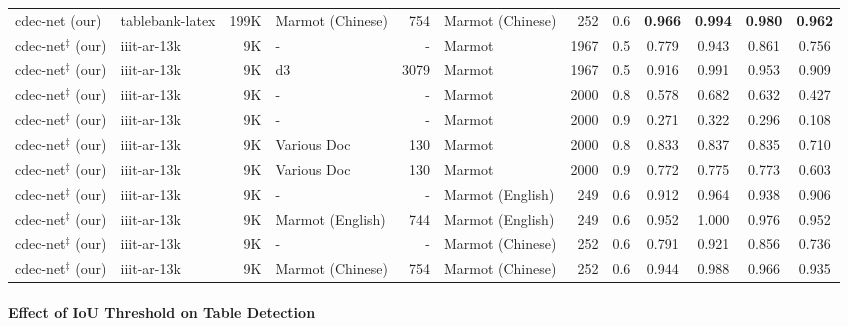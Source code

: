 \documentclass[a4paper,conference]{IEEEtran}
\begin{document}
\begin{table*}[ht!]
\begin{center}
\begin{tabular}{|l| l | r|l |r|l|r| c| c c c c|}
{\sc cd}e{\sc c-n}et (our) &{\sc t}able{\sc b}ank-{\sc l}a{\sc t}e{\sc x} &199K &Marmot (Chinese) &754 &Marmot (Chinese) &252 &0.6 &\textbf{0.966} &\textbf{0.994} &\textbf{0.980} &\textbf{0.962} \\ \hhline{|=|=|=|=|=|=|=|=|====|}
{\sc cd}e{\sc c-n}et$^{\ddagger}$ (our) &{\sc iiit-ar-13k} &9K &- &- &Marmot &1967 &0.5 &0.779 &0.943 &0.861 &0.756 \\
{\sc cd}e{\sc c-n}et$^{\ddagger}$ (our) &{\sc iiit-ar-13k} &9K &{\sc d3} &3079 &Marmot &1967 &0.5 &0.916 &0.991 &0.953 &0.909 \\ 
{\sc cd}e{\sc c-n}et$^{\ddagger}$ (our) &{\sc iiit-ar-13k} &9K &- &- &Marmot &2000 &0.8 &0.578 &0.682 &0.632 &0.427 \\ 
{\sc cd}e{\sc c-n}et$^{\ddagger}$ (our) &{\sc iiit-ar-13k} &9K &- &- &Marmot &2000 &0.9 &0.271 &0.322 &0.296 &0.108 \\ 
{\sc cd}e{\sc c-n}et$^{\ddagger}$ (our) &{\sc iiit-ar-13k} &9K &Various Doc &130 &Marmot &2000 &0.8 &0.833 &0.837 &0.835 &0.710 \\ 
{\sc cd}e{\sc c-n}et$^{\ddagger}$ (our) &{\sc iiit-ar-13k} &9K &Various Doc &130 &Marmot &2000 &0.9 &0.772 &0.775 &0.773 &0.603 \\
{\sc cd}e{\sc c-n}et$^{\ddagger}$ (our) &{\sc iiit-ar-13k} &9K &- &- &Marmot (English) &249 &0.6 &0.912 &0.964 &0.938 &0.906 \\
{\sc cd}e{\sc c-n}et$^{\ddagger}$ (our) &{\sc iiit-ar-13k} &9K &Marmot (English) &744 &Marmot (English) &249 &0.6 &0.952 &1.000 &0.976 &0.952 \\
{\sc cd}e{\sc c-n}et$^{\ddagger}$ (our) &{\sc iiit-ar-13k} &9K &- &- &Marmot (Chinese) &252 &0.6 &0.791 &0.921 &0.856 &0.736 \\
{\sc cd}e{\sc c-n}et$^{\ddagger}$ (our) &{\sc iiit-ar-13k} &9K &Marmot (Chinese) &754 &Marmot (Chinese) &252 &0.6 &0.944 &0.988 &0.966 &0.935 \\ \hline
\end{tabular}
\end{center}
\caption{Illustrates comparison between the proposed {\sc cd}e{\sc c-n}et and state-of-the-art techniques on {\sc m}armot dataset. {\sc \textbf{d3:}} indicates {\sc icdar-2013}+{\sc icdar-2017}+{\sc unlv}. {\sc cd}e{\sc c-n}et$^{\ddagger}$\textbf{:} indicates a single  model which is trained with {\sc iiit-ar-13k} dataset. \label{table_marmot_arxiv}}
\end{table*}

\paragraph*{\textbf{Effect of IoU Threshold on Table Detection}}
\end{document}
